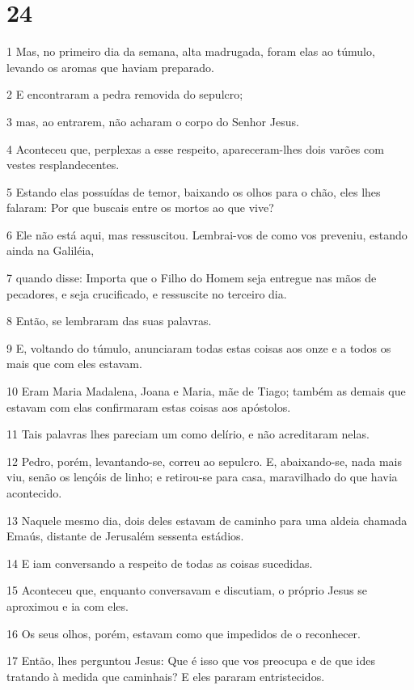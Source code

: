 \chapter{24}

\par 1 Mas, no primeiro dia da semana, alta madrugada, foram elas ao túmulo, levando os aromas que haviam preparado.
\par 2 E encontraram a pedra removida do sepulcro;
\par 3 mas, ao entrarem, não acharam o corpo do Senhor Jesus.
\par 4 Aconteceu que, perplexas a esse respeito, apareceram-lhes dois varões com vestes resplandecentes.
\par 5 Estando elas possuídas de temor, baixando os olhos para o chão, eles lhes falaram: Por que buscais entre os mortos ao que vive?
\par 6 Ele não está aqui, mas ressuscitou. Lembrai-vos de como vos preveniu, estando ainda na Galiléia,
\par 7 quando disse: Importa que o Filho do Homem seja entregue nas mãos de pecadores, e seja crucificado, e ressuscite no terceiro dia.
\par 8 Então, se lembraram das suas palavras.
\par 9 E, voltando do túmulo, anunciaram todas estas coisas aos onze e a todos os mais que com eles estavam.
\par 10 Eram Maria Madalena, Joana e Maria, mãe de Tiago; também as demais que estavam com elas confirmaram estas coisas aos apóstolos.
\par 11 Tais palavras lhes pareciam um como delírio, e não acreditaram nelas.
\par 12 Pedro, porém, levantando-se, correu ao sepulcro. E, abaixando-se, nada mais viu, senão os lençóis de linho; e retirou-se para casa, maravilhado do que havia acontecido.
\par 13 Naquele mesmo dia, dois deles estavam de caminho para uma aldeia chamada Emaús, distante de Jerusalém sessenta estádios.
\par 14 E iam conversando a respeito de todas as coisas sucedidas.
\par 15 Aconteceu que, enquanto conversavam e discutiam, o próprio Jesus se aproximou e ia com eles.
\par 16 Os seus olhos, porém, estavam como que impedidos de o reconhecer.
\par 17 Então, lhes perguntou Jesus: Que é isso que vos preocupa e de que ides tratando à medida que caminhais? E eles pararam entristecidos.
